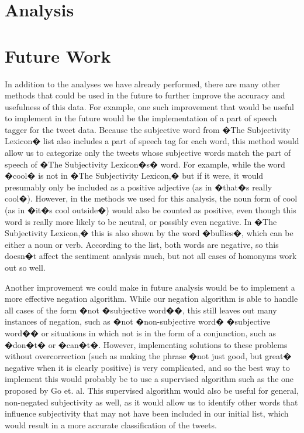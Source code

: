 \documentclass[11pt]{article}
\begin{document}
\section{Analysis}

\section{Future Work}
In addition to the analyses we have already performed, there are many other methods that could be used in the future to further improve the accuracy and usefulness of this data.  For example, one such improvement that would be useful to implement in the future would be the implementation of a part of speech tagger for the tweet data.  Because the subjective word from �The Subjectivity Lexicon� list also includes a part of speech tag for each word, this method would allow us to categorize only the tweets whose subjective words match the part of speech of �The Subjectivity Lexicon�s� word.  For example, while the word �cool� is not in �The Subjectivity Lexicon,� but if it were, it would presumably only be included as a positive adjective (as in �that�s really cool�).  However, in the methods we used for this analysis, the noun form of cool (as in �it�s cool outside�) would also be counted as positive, even though this word is really more likely to be neutral, or possibly even negative.  In �The Subjectivity Lexicon,� this is also shown by the word �bullies�, which can be either a noun or verb.  According to the list, both words are negative, so this doesn�t affect the sentiment analysis much, but not all cases of homonyms work out so well.

Another improvement we could make in future analysis would be to implement a more effective negation algorithm.  While our negation algorithm is able to handle all cases of the form �not �subjective word��, this still leaves out many instances of negation, such as �not �non-subjective word� �subjective word�� or situations in which not is in the form of a conjunction, such as �don�t� or �can�t�.  However, implementing solutions to these problems without overcorrection (such as making the phrase �not just good, but great� negative when it is clearly positive) is very complicated, and so the best way to implement this would probably be to use a supervised algorithm such as the one proposed by Go et. al.   This supervised algorithm would also be useful for general, non-negated subjectivity as well, as it would allow us to identify other words that influence subjectivity that may not have been included in our initial list, which would result in a more accurate classification of the tweets.
\end{document}
